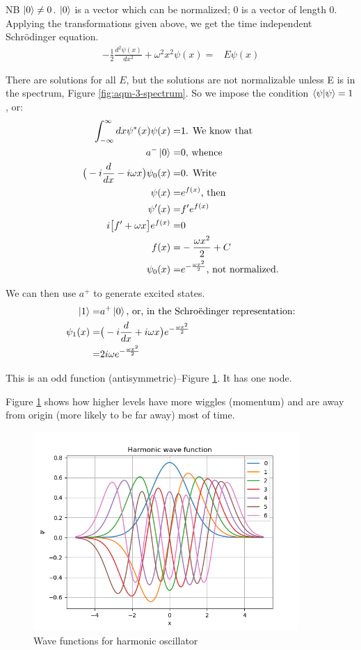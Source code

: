 \documentclass[]{article}
\begin{document}
NB $\ket{0} \ne 0$. $\ket{0}$ is a vector which can be normalized; $0$ is a vector of length 0.
Applying the transformations given above, we get the time independent Schr\"odinger equation.
\begin{align*}
	-\frac{1}{2}\frac{d^2 \psi(x)}{dx^2} + \omega^2 x^2 \psi(x)=& E\psi(x)
\end{align*}

 There are solutions for all $E$, but the solutions are not normalizable unless E is in the spectrum, Figure \ref{fig:aqm-3-spectrum}. So we impose the condition $\braket{\psi|\psi}=1$, or:
\begin{align*}
	\int_{-\infty}^{\infty} dx \psi^*(x) \psi(x) =& 1 \text{. We know that}\\
	a^-\ket{0}=& 0 \text{, whence}\\
	\big(-i \frac{d}{dx} - i \omega x \big)\psi_0(x) =& 0 \text{. Write}\\
	\psi(x)=&e^{f(x)} \text{, then}\\
	\psi^\prime(x) =&f^\prime e^{f(x)}\\
	i \big[f^\prime  + \omega x\big]e^{f(x)} =&0\\
	f(x) =& -\frac{\omega x^2}{2}+C\\
	\psi_0(x) =& e^{-\frac{\omega x^2}{2}} \text{, not normalized.}
\end{align*}

We can then use $a^+$  to generate excited states.
\begin{align*}
	\ket{1}=& a^+ \ket{0} \text{, or, in the Schro\"edinger representation:}\\
	\psi_1(x) =& \big(-i \frac{d}{dx} + i \omega x \big) e^{-\frac{\omega x^2}{2}}\\
	=& 2 i \omega e^{-\frac{\omega x^2}{2}}
\end{align*}

This is an odd function (antisymmetric)--Figure \ref{fig:wave:harmonic}. It has one node.

Figure \ref{fig:wave:harmonic} shows how higher levels have more wiggles (momentum) and are away from origin (more likely to be far away) most of time.

\begin{figure}[H]
	\caption{Wave functions for harmonic oscillator}\label{fig:wave:harmonic}
	\includegraphics[width=0.9\textwidth]{harmonic_wavefunction}
\end{figure}
\end{document}
